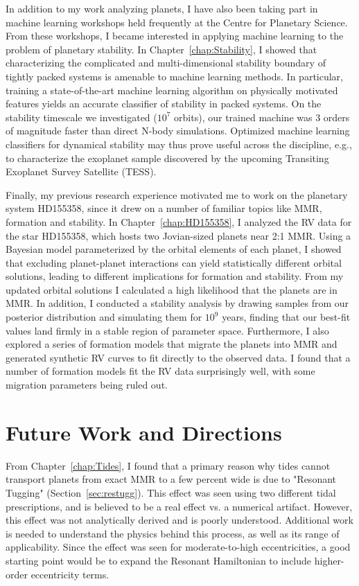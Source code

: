In addition to my work analyzing \kep planets, I have also been taking part in machine learning workshops held frequently at the Centre for Planetary Science. 
From these workshops, I became interested in applying machine learning to the problem of planetary stability. 
In Chapter~\ref{chap:Stability}, I showed that characterizing the complicated and multi-dimensional stability boundary of tightly packed systems is amenable to machine learning methods. 
In particular, training a state-of-the-art machine learning algorithm on physically motivated features yields an accurate classifier of stability in packed systems. 
On the stability timescale we investigated ($10^7$ orbits), our trained machine was 3 orders of magnitude faster than direct N-body simulations. 
Optimized machine learning classifiers for dynamical stability may thus prove useful across the discipline, e.g., to characterize the exoplanet sample discovered by the upcoming Transiting Exoplanet Survey Satellite (TESS).

Finally, my previous research experience motivated me to work on the planetary system HD155358, since it drew on a number of familiar topics like MMR, formation and stability. 
In Chapter~\ref{chap:HD155358}, I analyzed the RV data for the star HD155358, which hosts two Jovian-sized planets near 2:1 MMR. 
Using a Bayesian model parameterized by the orbital elements of each planet, I showed that excluding planet-planet interactions can yield statistically different orbital solutions, leading to different implications for formation and stability. 
From my updated orbital solutions I calculated a high likelihood that the planets are in MMR. 
In addition, I conducted a stability analysis by drawing samples from our posterior distribution and simulating them for $10^9$ years, finding that our best-fit values land firmly in a stable region of parameter space.
Furthermore, I also explored a series of formation models that migrate the planets into MMR and generated synthetic RV curves to fit directly to the observed data. 
I found that a number of formation models fit the RV data surprisingly well, with some migration parameters being ruled out.

\section{Future Work and Directions}
\label{sec:Future}
From Chapter~\ref{chap:Tides}, I found that a primary reason why tides cannot transport planets from exact MMR to a few percent wide is due to "Resonant Tugging" (Section~\ref{sec:restugg}).
This effect was seen using two different tidal prescriptions, and is believed to be a real effect vs. a numerical artifact. 
However, this effect was not analytically derived and is poorly understood. 
Additional work is needed to understand the physics behind this process, as well as its range of applicability.
Since the effect was seen for moderate-to-high eccentricities, a good starting point would be to expand the Resonant Hamiltonian to include higher-order eccentricity terms. 

